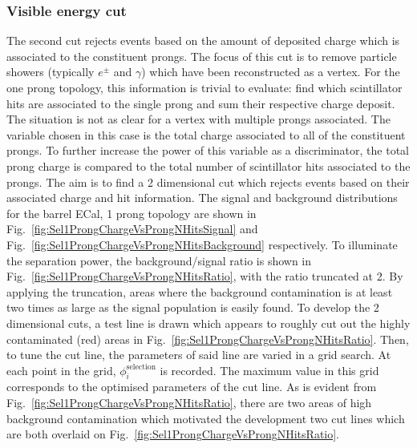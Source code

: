 \subsubsection{Visible energy cut}
\label{subsubsec:VisibleEnergyCut}
The second cut rejects events based on the amount of deposited charge which is associated to the constituent prongs. The focus of this cut is to remove particle showers (typically $e^\pm$ and $\gamma$) which have been reconstructed as a vertex.  For the one prong topology, this information is trivial to evaluate: find which scintillator hits are associated to the single prong and sum their respective charge deposit.  The situation is not as clear for a vertex with multiple prongs associated.  The variable chosen in this case is the total charge associated to all of the constituent prongs.  To further increase the power of this variable as a discriminator, the total prong charge is compared to the total number of scintillator hits associated to the prongs.  The aim is to find a 2 dimensional cut which rejects events based on their associated charge and hit information.
\newline
\newline
The signal and background distributions for the barrel ECal, 1 prong topology are shown in Fig.~\ref{fig:Sel1ProngChargeVsProngNHitsSignal} and Fig.~\ref{fig:Sel1ProngChargeVsProngNHitsBackground} respectively.  To illuminate the separation power, the background/signal ratio is shown in Fig.~\ref{fig:Sel1ProngChargeVsProngNHitsRatio}, with the ratio truncated at 2.  By applying the truncation, areas where the background contamination is at least two times as large as the signal population is easily found.  To develop the 2 dimensional cuts, a test line is drawn which appears to roughly cut out the highly contaminated (red) areas in Fig.~\ref{fig:Sel1ProngChargeVsProngNHitsRatio}.  Then, to tune the cut line, the parameters of said line are varied in a grid search.  At each point in the grid, $\phi_i^{\textrm{selection}}$ is recorded.  The maximum value in this grid corresponds to the optimised parameters of the cut line.  As is evident from Fig.~\ref{fig:Sel1ProngChargeVsProngNHitsRatio}, there are two areas of high background contamination which motivated the development two cut lines which are both overlaid on Fig.~\ref{fig:Sel1ProngChargeVsProngNHitsRatio}.
